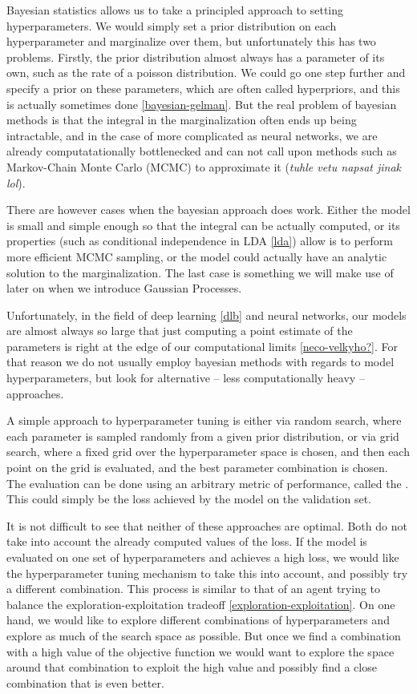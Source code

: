 Bayesian statistics allows us to take a principled approach to setting
hyperparameters.  We would simply set a prior distribution on each
hyperparameter and marginalize over them, but unfortunately this has two
problems. Firstly, the prior distribution almost always has a parameter of its
own, such as the rate of a poisson distribution. We could go one step further
and specify a prior on these parameters, which are often called hyperpriors,
and this is actually sometimes done \ref{bayesian-gelman}. But the real problem
of bayesian methods is that the integral in the marginalization often ends up
being intractable, and in the case of more complicated as neural networks, we
are already computatationally bottlenecked and can not call upon methods such
as Markov-Chain Monte Carlo (MCMC) to approximate it (\emph{tuhle vetu napsat
jinak lol}).

There are however cases when the bayesian approach does work. Either the model
is small and simple enough so that the integral can be actually computed, or
its properties (such as conditional independence in LDA \ref{lda}) allow is to
perform more efficient MCMC sampling, or the model could actually have an
analytic solution to the marginalization. The last case is something we will
make use of later on when we introduce Gaussian Processes.

Unfortunately, in the field of deep learning \ref{dlb} and neural networks, our models
are almost always so large that just computing a point estimate of the
parameters is right at the edge of our computational limits
\ref{neco-velkyho?}. For that reason we do not usually employ bayesian methods
with regards to model hyperparameters, but look for alternative -- less
computationally heavy -- approaches.

A simple approach to hyperparameter tuning is either via random search, where
each parameter is sampled randomly from a given prior distribution, or via grid
search, where a fixed grid over the hyperparameter space is chosen, and then
each point on the grid is evaluated, and the best parameter combination is
chosen. The evaluation can be done using an arbitrary metric of performance,
called the . This could simply be the loss
achieved by the model on the validation set.

It is not difficult to see that neither of these approaches are optimal.  Both
do not take into account the already computed values of the loss. If the model
is evaluated on one set of hyperparameters and achieves a high loss, we would
like the hyperparameter tuning mechanism to take this into account, and
possibly try a different combination. This process is similar to that of an
agent trying to balance the exploration-exploitation tradeoff
\ref{exploration-exploitation}. On one hand, we would like to explore different
combinations of hyperparameters and explore as much of the search space as
possible.  But once we find a combination with a high value of the objective
function we would want to explore the space around that combination to exploit
the high value and possibly find a close combination that is even better.

